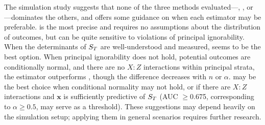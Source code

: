\documentclass[]{article}
\begin{document}
\label{evalMetric}The simulation study suggests that none of the three methods evaluated---\geepers, \pmm, or \psw---dominates the others, and offers some guidance on when each estimator may be preferable. \psw is the most precise and requires no assumptions about the distribution of outcomes, but can be quite sensitive to violations of principal ignorability. When the determinants of $S_T$ are well-understood and measured, \psw seems to be the best option. When principal ignorability does not hold, potential outcomes are conditionally normal, and there are no $X:Z$ interactions within principal strata, the \pmm estimator outperforms \geepers, though the difference decreases with $n$ or $\alpha$. \geepers may be the best choice when conditional normality may not hold, or if there are $X:Z$ interactions and $\bm{x}$ is sufficiently predictive of $S_T$ (AUC $\ge$0.675, corresponding to $\alpha \ge 0.5$, may serve as a threshold). 
These suggestions may depend heavily on the simulation setup; applying them in general scenarios requires further research. 


\end{document}
